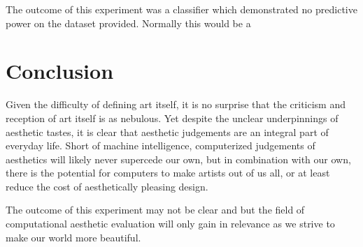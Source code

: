 \documentclass[midd]{thesis}
\begin{document}



The outcome of this experiment was a classifier which demonstrated no predictive power on the dataset provided. Normally this would be a






























\chapter{Conclusion}







Given the difficulty of defining art itself, it is no surprise that the criticism and reception of art itself is as nebulous. Yet despite the unclear underpinnings of aesthetic tastes, it is clear that aesthetic judgements are an integral part of everyday life. Short of machine intelligence, computerized judgements of aesthetics will likely never supercede our own, but in combination with our own, there is the potential for computers to make artists out of us all, or at least reduce the cost of aesthetically pleasing design.

The outcome of this experiment may not be clear and but the field of computational aesthetic evaluation will only gain in relevance as we strive to make our world more beautiful.
























\nocite{*}

\end{document}
